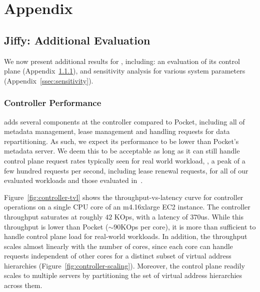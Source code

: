 \chapter{Appendix}

\section{Jiffy: Additional Evaluation}
\label{sec:appendix}


We now present additional results for \jiffy, including: an evaluation of its control plane (Appendix~\ref{ssec:controller-scale}), and sensitivity analysis for various system parameters (Appendix~\ref{ssec:sensitivity}).

\subsection{Controller Performance}
\label{ssec:controller-scale}

\jiffy adds several components at the controller compared to Pocket, including all of metadata management, lease management and handling requests for data repartitioning. As such, we expect its performance to be lower than Pocket's metadata server. We deem this to be acceptable as long as it can still handle control plane request rates typically seen for real world workload, \eg, a peak of a few hundred requests per second, including lease renewal requests, for all of our evaluated workloads and those evaluated in~\cite{pocket}.

Figure~\ref{fig:controller-tvl} shows the throughput-vs-latency curve for \jiffy controller operations on a single CPU core of an m4.16xlarge EC2 instance. The controller throughput saturates at roughly $42$ KOps, with a latency of $370$us. While this throughput is lower than Pocket ($\sim 90$KOps per core), it is more than sufficient to handle control plane load for real-world workloads. In addition, the throughput scales almost linearly with the number of cores, since each core can handle requests independent of other cores for a distinct subset of virtual address hierarchies (Figure~\ref{fig:controller-scaling}). Moreover, the \jiffy control plane readily scales to multiple servers by partitioning the set of virtual address hierarchies across them.

